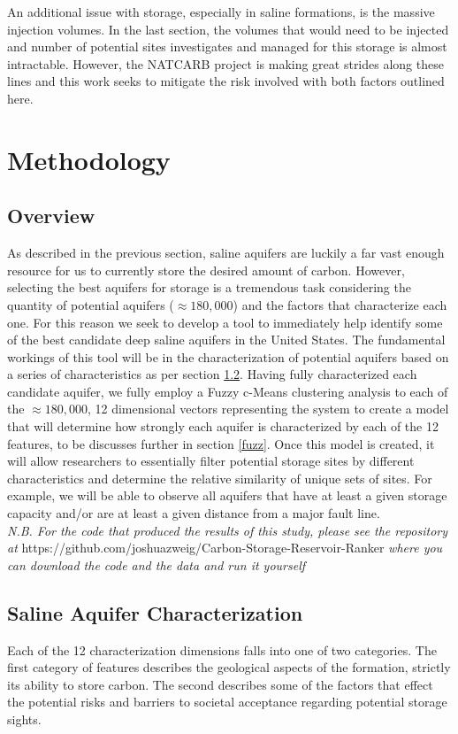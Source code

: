 \documentclass[letterpaper, 12pt]{article}
\begin{document}
An additional issue with storage, especially in saline formations, is the massive injection volumes. In the last section, the volumes that would need to be injected and number of potential sites investigates and managed for this storage is almost intractable. However, the NATCARB project is making great strides along these lines and this work seeks to mitigate the risk involved with both factors outlined here. 

\section{Methodology}
\subsection{Overview}
As described in the previous section, saline aquifers are luckily a far vast enough resource for us to currently store the desired amount of carbon. However, selecting the best aquifers for storage is a tremendous task considering the quantity of potential aquifers ($\approx180,000$) and the factors that characterize each one. For this reason we seek to develop a tool to immediately help identify some of the best candidate deep saline aquifers in the United States. 
The fundamental workings of this tool will be in the characterization of potential aquifers based on a series of characteristics as per section \ref{wellchar}. Having fully characterized each candidate aquifer, we fully employ a Fuzzy c-Means clustering analysis to each of the $\approx180,000$, 12 dimensional vectors representing the system to create a model that will determine how strongly each aquifer is characterized by each of the 12 features, to be discusses further in section \ref{fuzz}. Once this model is created, it will allow researchers to essentially filter potential storage sites by different characteristics and determine the relative similarity of unique sets of sites. For example, we will be able to observe all aquifers that have at least a given storage capacity and/or are at least a given distance from a major fault line.  
\\
\noindent \emph{N.B. For the code that produced the results of this study, please see the repository \\at} https://github.com/joshuazweig/Carbon-Storage-Reservoir-Ranker \emph{where you can download the code and the data and run it yourself}

\subsection{Saline Aquifer Characterization} \label{wellchar}
Each of the 12 characterization dimensions falls into one of two categories. The first category of features describes the geological aspects of the formation, strictly its ability to store carbon. The second describes some of the factors that effect the potential risks and barriers to societal acceptance regarding potential storage sights.
\end{document}
